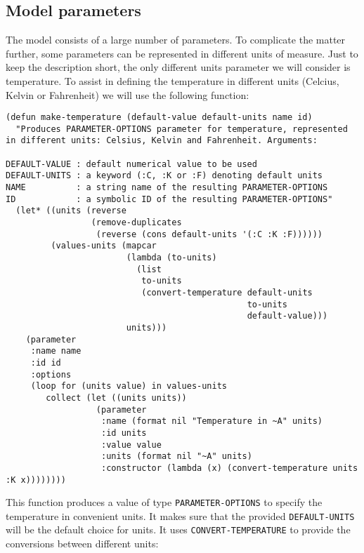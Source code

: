 \documentclass[listings, a4paper, fleqn, pdftex, 12pt, openany, oneside, final]{memoir}
\theoremstyle{definition}
\begin{document}
\subsection{Model parameters}
\label{sec:orgheadline5}
The model consists of a large number of parameters. To complicate the
matter further, some parameters can be represented in different units
of measure. Just to keep the description short, the only different
units parameter we will consider is temperature. To assist in defining
the temperature in different units (Celcius, Kelvin or Fahrenheit) we
will use the following function:

\begin{verbatim}
(defun make-temperature (default-value default-units name id)
  "Produces PARAMETER-OPTIONS parameter for temperature, represented
in different units: Celsius, Kelvin and Fahrenheit. Arguments:

DEFAULT-VALUE : default numerical value to be used
DEFAULT-UNITS : a keyword (:C, :K or :F) denoting default units
NAME          : a string name of the resulting PARAMETER-OPTIONS
ID            : a symbolic ID of the resulting PARAMETER-OPTIONS"
  (let* ((units (reverse
                 (remove-duplicates
                  (reverse (cons default-units '(:C :K :F))))))
         (values-units (mapcar
                        (lambda (to-units)
                          (list
                           to-units
                           (convert-temperature default-units
                                                to-units
                                                default-value)))
                        units)))
    (parameter
     :name name
     :id id
     :options
     (loop for (units value) in values-units
        collect (let ((units units))
                  (parameter
                   :name (format nil "Temperature in ~A" units)
                   :id units
                   :value value
                   :units (format nil "~A" units)
                   :constructor (lambda (x) (convert-temperature units :K x))))))))
\end{verbatim}


This function produces a value of type \texttt{PARAMETER-OPTIONS} to specify
the temperature in convenient units. It makes sure that the provided
\texttt{DEFAULT-UNITS} will be the default choice for units. It uses
\texttt{CONVERT-TEMPERATURE} to provide the conversions between different
units:
\end{document}
